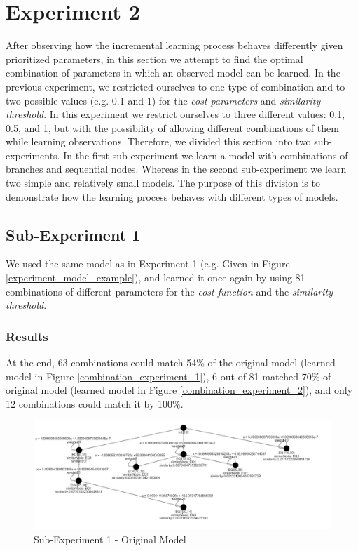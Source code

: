\newpage

\section{Experiment 2}
After observing how the incremental learning process behaves differently given prioritized parameters, in this section we attempt to find the optimal combination of parameters in which an observed model can be learned. In the previous experiment, we restricted ourselves to one type of combination and to two possible values (e.g. 0.1 and 1) for the \textit{cost parameters} and \textit{similarity threshold}. In this experiment we restrict ourselves to three different values: 0.1, 0.5, and 1, but with the possibility of allowing different combinations of them while learning observations. Therefore, we divided this section into two sub-experiments. In the first sub-experiment we learn a model with combinations of branches and sequential nodes. Whereas in the second sub-experiment we learn two simple and relatively small models. The purpose of this division is to demonstrate how the learning process behaves with different types of models.

\subsection{Sub-Experiment 1}
We used the same model as in Experiment 1 (e.g. Given in Figure \ref{experiment_model_example}), and learned it once again by using 81 combinations of different parameters for the \textit{cost function} and the \textit{similarity threshold}.

\subsubsection{Results}
At the end, 63 combinations could match 54\% of the original model (learned model in Figure \ref{combination_experiment_1}), 6 out of 81 matched 70\% of original model (learned model in Figure \ref{combination_experiment_2}), and only 12 combinations could match it by 100\%. 
% 
\begin{figure}[h]
	\centering
	\includegraphics[scale=0.6]{./pictures/experiment.png}
	\caption{Sub-Experiment 1 - Original Model}
	\label{combination_experiment_model}
\end{figure}

